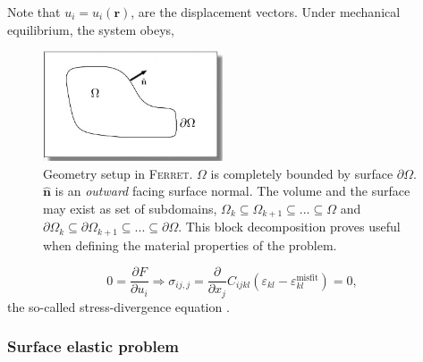 \documentclass[22pt]{article} %
\begin{document}
%
Note that $u_i =  u_i (\textbf{r})$, are the displacement vectors.
%
Under mechanical equilibrium, the system obeys,
%
\begin{figure}
  \begin{center}
\vspace{-12pt}
    \includegraphics[width=0.475\textwidth]{geometry.jpg}
  \end{center}
  \caption{Geometry setup in \textsc{Ferret}.
%
$\Omega$ is completely bounded by surface $\partial \Omega$. $\hat{\textbf{n}}$ is an \emph{outward} facing surface normal.
%
The volume and the surface may exist as set of subdomains, $\Omega_k \subseteq \Omega_{k+1} \subseteq ... \subseteq \Omega$ and $\partial \Omega_k \subseteq \partial \Omega_{k+1} \subseteq ... \subseteq \partial \Omega$.
%
This block decomposition proves useful when defining the material properties of the problem.} %
\end{figure}
%
%
\begin{equation}\tag{3}
0 = \frac{\partial F}{\partial u_i} \Rightarrow \sigma_{ij,j} = \frac{\partial}{\partial x_j} C_{ijkl} \left(\varepsilon_{kl} - \varepsilon_{kl}^\mathrm{misfit} \right) = 0,
\end{equation}
%
the so-called stress-divergence equation \cite{Morton1975, BowerBook}.
%

%
\subsubsection{Surface elastic problem}
%
\end{document}
